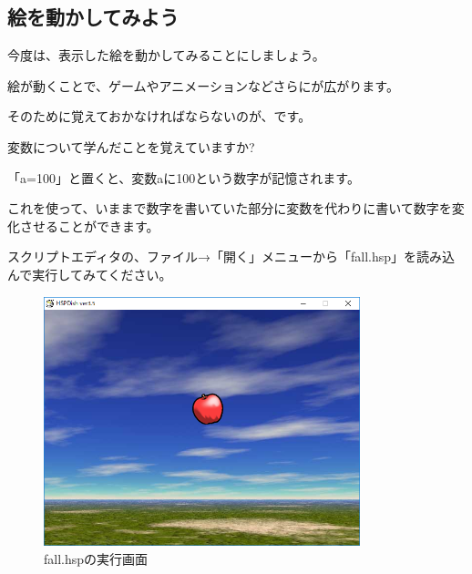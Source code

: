 \newpage
\subsection{絵を動かしてみよう}



今度は、表示した絵を動かしてみることにしましょう。

絵が動くことで、ゲームやアニメーションなどさらにが広がります。

そのために覚えておかなければならないのが、です。


変数について学んだことを覚えていますか?


\begin{description}
    \item {}
    \item {}
    \item {}
    \item {}
\end{description}

「a=100」と置くと、変数aに100という数字が記憶されます。

これを使って、いままで数字を書いていた部分に変数を代わりに書いて数字を変化させることができます。

スクリプトエディタの、ファイル→「開く」メニューから「fall.hsp」を読み込んで実行してみてください。



\begin{figure}[H]
    \begin{center}
      \includegraphics[keepaspectratio,width=9.183cm,height=7.241cm]{text04-img/s_fall.png}
      \caption{fall.hspの実行画面}
    \end{center}
    \label{fig:prog_menu}
\end{figure}

